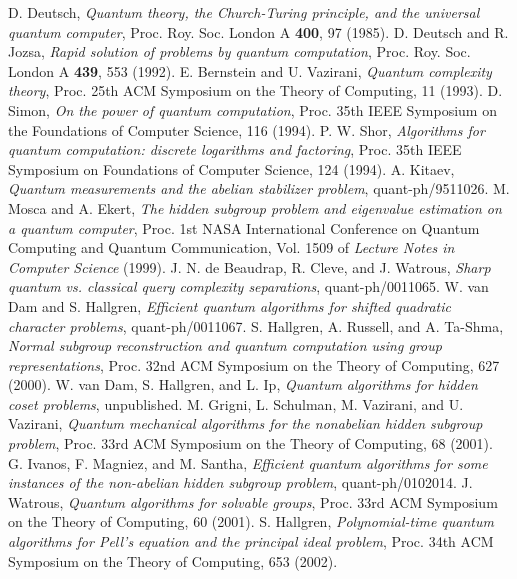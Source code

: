 \documentclass[aps,11pt,twoside,nofootinbib,tightenlines,superscriptaddress,preprintnumbers]{revtex4}
\newcommand{\<}{\langle}
\renewcommand{\>}{\rangle}
\newcommand{\qph}[1]{quant-ph/#1}
\begin{document}
\begin{thebibliography}{}
  D. Deutsch, 
  {\em Quantum theory, the Church-Turing principle, and the universal
  quantum computer},
  Proc. Roy. Soc. London A {\bf 400}, 97 (1985).
  D. Deutsch and R. Jozsa, 
  {\em Rapid solution of problems by quantum computation}, 
  Proc. Roy. Soc.  London A {\bf 439}, 553 (1992).
  E. Bernstein and U. Vazirani,
  {\em Quantum complexity theory}, 
  Proc. 25th ACM Symposium on the Theory of Computing, 11 (1993).
  D. Simon,
  {\em On the power of quantum computation},
  Proc. 35th IEEE Symposium on the Foundations of Computer Science,
  116 (1994).
  P. W. Shor,
  {\em Algorithms for quantum computation: discrete logarithms and
  factoring},
  Proc. 35th IEEE Symposium on Foundations of Computer Science, 124
  (1994).
  A. Kitaev,
  {\em Quantum measurements and the abelian stabilizer problem},
  \qph{9511026}.
  M. Mosca and A. Ekert,
  {\em The hidden subgroup problem and eigenvalue estimation on a quantum
  computer},
  Proc. 1st NASA International Conference on Quantum Computing and Quantum
  Communication, Vol. 1509 of {\em Lecture Notes in Computer Science}
  (1999).
  J. N. de Beaudrap, R. Cleve, and J. Watrous,
  {\em Sharp quantum vs. classical query complexity separations},
  \qph{0011065}.
  W. van Dam and S. Hallgren,
  {\em Efficient quantum algorithms for shifted quadratic character
  problems},
  \qph{0011067}.
  S. Hallgren, A. Russell, and A. Ta-Shma,
  {\em Normal subgroup reconstruction and quantum computation using group
  representations},
  Proc. 32nd ACM Symposium on the Theory of Computing, 627 (2000).
  W. van Dam, S. Hallgren, and L. Ip,
  {\em Quantum algorithms for hidden coset problems},
  unpublished.
  M. Grigni, L. Schulman, M. Vazirani, and U. Vazirani,
  {\em Quantum mechanical algorithms for the nonabelian hidden subgroup
  problem},
  Proc. 33rd ACM Symposium on the Theory of Computing,
  68 (2001).
  G. Ivanos, F. Magniez, and M. Santha,
  {\em Efficient quantum algorithms for some instances of the non-abelian
  hidden subgroup problem},
  \qph{0102014}.
  J. Watrous,
  {\em Quantum algorithms for solvable groups},
  Proc. 33rd ACM Symposium on the Theory of Computing, 60 (2001).
  S. Hallgren,
  {\em Polynomial-time quantum algorithms for Pell's equation and the
  principal ideal problem},
  Proc. 34th ACM Symposium on the Theory of Computing, 653 (2002).

\end{thebibliography}
\end{document}
